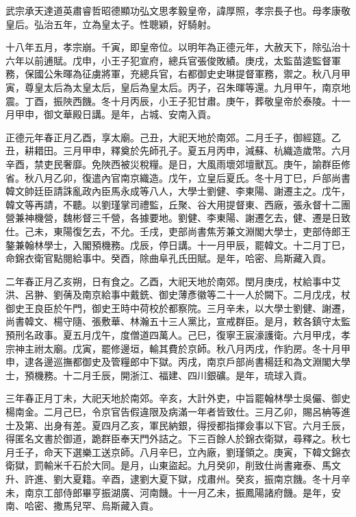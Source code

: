 
\begin{pinyinscope}
武宗承天達道英肅睿哲昭德顯功弘文思孝毅皇帝，諱厚照，孝宗長子也。母孝康敬皇后。弘治五年，立為皇太子。性聰穎，好騎射。

十八年五月，孝宗崩。千寅，即皇帝位。以明年為正德元年，大赦天下，除弘治十六年以前逋賦。戊申，小王子犯宣府，總兵官張俊敗績。庚戌，太監苗逵監督軍務，保國公朱暉為征虜將軍，充總兵官，右都御史史琳提督軍務，禦之。秋八月甲寅，尊皇太后為太皇太后，皇后為皇太后。丙子，召朱暉等還。九月甲午，南京地震。丁酉，振陜西饑。冬十月丙辰，小王子犯甘肅。庚午，葬敬皇帝於泰陵。十一月甲申，御文華殿日講。是年，占城、安南入貢。

正德元年春正月乙酉，享太廟。己丑，大祀天地於南郊。二月壬子，御經筵。乙丑，耕耤田。三月甲申，釋奠於先師孔子。夏五月丙申，減蘇、杭織造歲幣。六月辛酉，禁吏民奢靡。免陜西被災稅糧。是日，大風雨壞郊壇獸瓦。庚午，諭群臣修省。秋八月乙卯，復遣內官南京織造。戊午，立皇后夏氏。冬十月丁巳，戶部尚書韓文帥廷臣請誅亂政內臣馬永成等八人，大學士劉健、李東陽、謝遷主之。戊午，韓文等再請，不聽。以劉瑾掌司禮監，丘聚、谷大用提督東、西廠，張永督十二團營兼神機營，魏彬督三千營，各據要地。劉健、李東陽、謝遷乞去，健、遷是日致仕。己未，東陽復乞去，不允。壬戌，吏部尚書焦芳兼文淵閣大學士，吏部侍郎王鏊兼翰林學士，入閣預機務。戊辰，停日講。十一月甲辰，罷韓文。十二月丁巳，命錦衣衛官點閱給事中。癸酉，除曲阜孔氏田賦。是年，哈密、烏斯藏入貢。

二年春正月乙亥朔，日有食之。乙酉，大祀天地於南郊。閏月庚戌，杖給事中艾洪、呂翀、劉蒨及南京給事中戴銑、御史薄彥徽等二十一人於闕下。二月戊戌，杖御史王良臣於午門，御史王時中荷校於都察院。三月辛未，以大學士劉健、謝遷，尚書韓文、楊守隨、張敷華、林瀚五十三人黨比，宣戒群臣。是月，敕各鎮守太監預刑名政事。夏五月戊午，度僧道四萬人。己巳，復寧王宸濠護衛。六月甲戌，孝宗神主祔太廟。戊寅，罷修邊垣，輸其費於京師。秋八月丙戌，作豹房。冬十月甲申，逮各邊巡撫都御史及管糧郎中下獄。丙戌，南京戶部尚書楊廷和為文淵閣大學士，預機務。十二月壬辰，開浙江、福建、四川銀礦。是年，琉球入貢。

三年春正月丁未，大祀天地於南郊。辛亥，大計外吏，中旨罷翰林學士吳儼、御史楊南金。二月己巳，令京官告假違限及病滿一年者皆致仕。三月乙卯，賜呂柟等進士及第、出身有差。夏四月乙亥，軍民納銀，得授都指揮僉事以下官。六月壬辰，得匿名文書於御道，跪群臣奉天門外詰之。下三百餘人於錦衣衛獄，尋釋之。秋七月壬子，命天下選樂工送京師。八月辛巳，立內廠，劉瑾領之。庚寅，下韓文錦衣衛獄，罰輸米千石於大同。是月，山東盜起。九月癸卯，削致仕尚書雍泰、馬文升、許進、劉大夏籍。辛酉，逮劉大夏下獄，戍肅州。癸亥，振南京饑。冬十月辛未，南京工部侍郎畢亨振湖廣、河南饑。十一月乙未，振鳳陽諸府饑。是年，安南、哈密、撒馬兒罕、烏斯藏入貢。


\end{pinyinscope}
